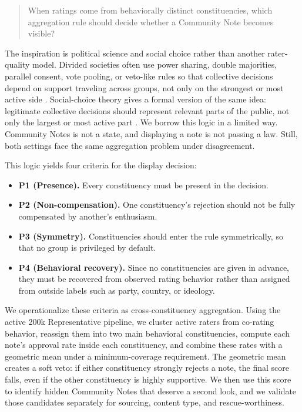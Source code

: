 \documentclass[10pt,twocolumn]{article}
\begin{document}
\begin{quote}
When ratings come from behaviorally distinct constituencies, which aggregation
rule should decide whether a Community Note becomes visible?
\end{quote}

The inspiration is political science and social choice rather than another
rater-quality model. Divided societies often use power sharing, double majorities,
parallel consent, vote pooling, or veto-like rules so that collective decisions
depend on support traveling across groups, not only on the strongest or most
active side \citep{lijphart1977democracy,mcgarryoleary2009,
horowitz1991makingmoderation,reilly2002electoral}. Social-choice theory gives a
formal version of the same idea: legitimate collective decisions should represent
relevant parts of the public, not only the largest or most active part
\citep{peters2019proportionality,qiu2025representative}. We borrow this logic in a
limited way. Community Notes is not a state, and displaying a note is not passing
a law. Still, both settings face the same aggregation problem under disagreement.

This logic yields four criteria for the display decision:
\begin{itemize}[leftmargin=*,itemsep=2pt,topsep=3pt]
    \item \textbf{P1 (Presence).} Every constituency must be present in the
    decision.
    \item \textbf{P2 (Non-compensation).} One constituency's rejection should
    not be fully compensated by another's enthusiasm.
    \item \textbf{P3 (Symmetry).} Constituencies should enter the rule
    symmetrically, so that no group is privileged by default.
    \item \textbf{P4 (Behavioral recovery).} Since no constituencies are given
    in advance, they must be recovered from observed rating behavior rather than
    assigned from outside labels such as party, country, or ideology.
\end{itemize}

We operationalize these criteria as cross-constituency aggregation. Using the
active 200k Representative pipeline, we cluster active raters from co-rating
behavior, reassign them into two main behavioral constituencies, compute each
note's approval rate inside each constituency, and combine these rates with a
geometric mean under a minimum-coverage requirement. The geometric mean creates a
soft veto: if either constituency strongly rejects a note, the final score falls,
even if the other constituency is highly supportive. We then use this score to
identify hidden Community Notes that deserve a second look, and we validate those
candidates separately for sourcing, content type, and rescue-worthiness.
\end{document}
